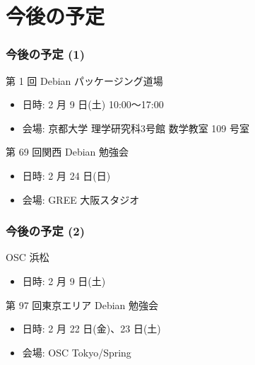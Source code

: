 \documentclass[cjk,dvipdfmx,10pt,compress,%
hyperref={bookmarks=true,bookmarksnumbered=true,bookmarksopen=false,%
colorlinks=false,%
pdftitle={第 68 回 関西 Debian 勉強会},%
pdfauthor={倉敷・のがた・佐々木・かわだ},%
pdfsubject={資料},%
}]{beamer}
\begin{document}
\section{今後の予定}
\begin{frame}[fragile]
\frametitle{今後の予定 (1)}

\begin{block}{第 1 回 Debian パッケージング道場}
  \begin{itemize}
  \item 日時: 2 月 9 日(土) 10:00〜17:00
  \item 会場: 京都大学 理学研究科3号館 数学教室 109 号室
  \end{itemize}
\end{block}

\begin{block}{第 69 回関西 Debian 勉強会}
  \begin{itemize}
  \item 日時: 2 月 24 日(日)
  \item 会場: GREE 大阪スタジオ
  \end{itemize}
\end{block}

\end{frame}

\begin{frame}[fragile]
\frametitle{今後の予定 (2)}

\begin{block}{OSC 浜松}
  \begin{itemize}
  \item 日時: 2 月 9 日(土)
  \end{itemize}
\end{block}

\begin{block}{第 97 回東京エリア Debian 勉強会}
  \begin{itemize}
  \item 日時: 2 月 22 日(金)、23 日(土)
  \item 会場: OSC Tokyo/Spring
  \end{itemize}
\end{block}

\end{frame}


\takahashi[50]{  }
\end{document}
